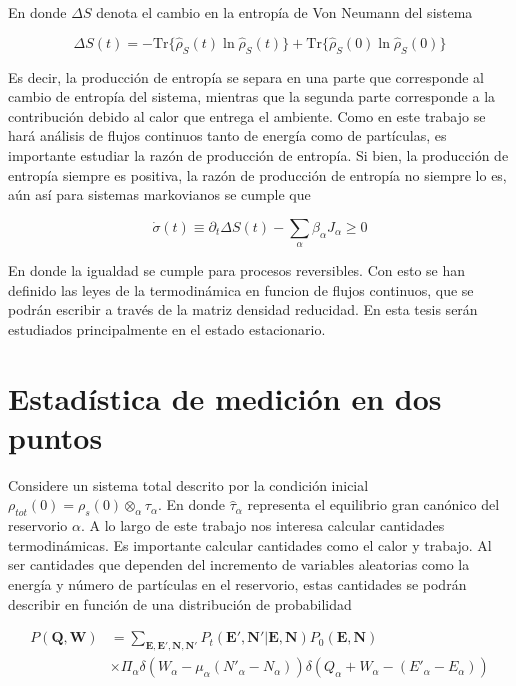 En donde $\Delta S$ denota el cambio en la entropía de Von Neumann del sistema

\begin{equation*}
    \Delta S(t) = -  \text{Tr}\{\hat{\rho}_{S}(t)\ln \hat{\rho}_{S}(t) \} +  \text{Tr}\{ \hat{\rho}_{S}(0)\ln \hat{\rho}_{S}(0) \}
\end{equation*}

Es decir, la producción de entropía se separa en una parte que corresponde al cambio de entropía del sistema, mientras que la segunda parte corresponde a la contribución debido al calor que entrega el ambiente. Como en este trabajo se hará análisis de flujos continuos tanto de energía como de partículas, es importante estudiar la razón de producción de entropía. Si bien, la producción de entropía siempre es positiva, la razón de producción de entropía no siempre lo es, aún así para sistemas markovianos se cumple que \cite{strasberg2019non}

\begin{equation*}
    \dot{\sigma}(t) \equiv \partial_{t}\Delta S(t) - \sum_{\alpha}\beta_{\alpha}J_{\alpha} \geq 0
\end{equation*}

En donde la igualdad se cumple para procesos reversibles. Con esto se han definido las leyes de la termodinámica en funcion de flujos continuos, que se podrán escribir a través de la matriz densidad reducidad. En esta tesis serán estudiados principalmente en el estado estacionario.

\label{sec3sub:leyestermo}

\section{Estadística de medición en dos puntos}
Considere un sistema total descrito por la condición inicial $\rho_{tot}(0) = \rho_{s}(0) \otimes_{\alpha} \tau_{\alpha}$. En donde $\hat{\tau}_{\alpha}$ representa el equilibrio gran canónico del reservorio $\alpha$. A lo largo de este trabajo nos interesa calcular cantidades termodinámicas. Es importante calcular cantidades como el calor y trabajo. Al ser cantidades que dependen del incremento de variables aleatorias como la energía y número de partículas en el reservorio, estas cantidades se podrán describir en función de una distribución de probabilidad

\begin{align*}
    P(\textbf{Q},\textbf{W}) & = \sum_{\textbf{E},\textbf{E}',\textbf{N},\textbf{N}'} P_{t}(\textbf{E}',\textbf{N}'|\textbf{E},\textbf{N}) P_{0}(\textbf{E},\textbf{N})\\
                             & \times \Pi_{\alpha} \delta(W_{\alpha} - \mu_{\alpha}(N'_{\alpha} - N_{\alpha})) \delta(Q_{\alpha} + W_{\alpha}  - (E'_{\alpha} - E_{\alpha}))   
\end{align*}

